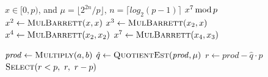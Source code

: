 \algrenewcommand{}
\algrenewcommand{}

\begin{algorithm}
\caption{S-box $x^7 \Mod p$}\label{alg:barrett}
\begin{algorithmic}[1]
\footnotesize
\Require $x \in [0,p)$, and $\mu = \lfloor 2^{2n}/p \rfloor$, $n=\lceil log_2(p-1) \rceil$
\Ensure $x^7 \Mod p$
\State $x^2 \gets \Call{MulBarrett}{x, x}$
\State $x^3 \gets \Call{MulBarrett}{x_2, x}$      
\State $x^4 \gets \Call{MulBarrett}{x_2, x_2}$
\State $x^7 \gets \Call{MulBarrett}{x_4, x_3}$

\footnotesize
{}
    \State $\mathit{prod} \gets \Call{Multiply}{a,b}$ 
    \State $\hat{q} \gets \Call{QuotientEst}{\mathit{prod}, \mu}$ 
    \State $r \gets \mathit{prod} - \hat{q}\cdot p$ 
    \State \Return $\Call{Select}{r < p,\ r,\ r-p}$ 
\EndFunction
\end{algorithmic}

\end{algorithm}




